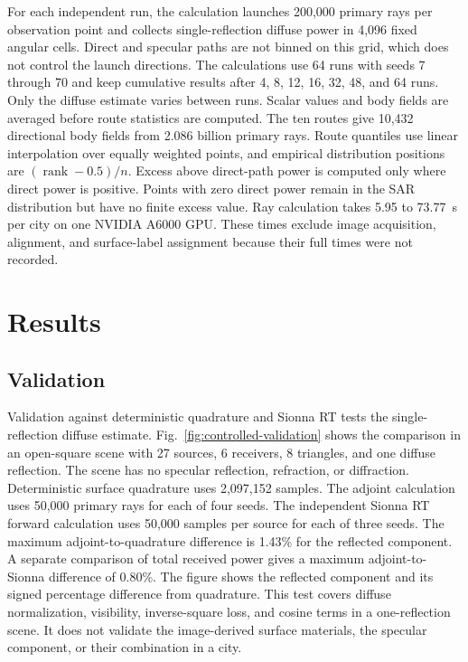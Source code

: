 \documentclass{IEEEoj}
\begin{document}
For each independent run, the calculation launches 200,000 primary rays per
observation point and collects single-reflection diffuse power in 4,096 fixed
angular cells. Direct and specular paths are not binned on this grid, which does
not control the launch directions. The calculations use 64 runs with seeds 7
through 70 and keep cumulative results after 4, 8, 12, 16, 32, 48, and 64 runs.
Only the diffuse estimate varies between runs. Scalar values and body fields
are averaged before route statistics are computed. The ten routes give 10,432
directional body fields from 2.086 billion primary rays. Route quantiles use
linear interpolation over equally weighted points, and empirical distribution
positions are $(\operatorname{rank}-0.5)/n$. Excess above direct-path power is
computed only where direct power is positive. Points with zero direct power
remain in the SAR distribution but have no finite excess value. Ray calculation
takes 5.95 to 73.77~s per city on one NVIDIA A6000 GPU. These times exclude
image acquisition, alignment, and surface-label assignment because their full
times were not recorded.

\section{Results}
\label{sec:results}

\subsection{Validation}
\label{sec:validation}

Validation against deterministic quadrature and Sionna RT tests the
single-reflection diffuse estimate. Fig.~\ref{fig:controlled-validation} shows
the comparison in an open-square scene with 27 sources, 6 receivers, 8
triangles, and one diffuse reflection. The scene has no specular reflection,
refraction, or diffraction. Deterministic surface quadrature uses 2,097,152
samples. The adjoint calculation uses 50,000 primary rays for each of four
seeds. The independent Sionna RT forward calculation uses 50,000 samples per
source for each of three seeds. The maximum adjoint-to-quadrature difference is
1.43\% for the reflected component. A separate comparison of total received
power gives a maximum adjoint-to-Sionna difference of 0.80\%. The figure shows
the reflected component and its signed percentage difference from quadrature. This test
covers diffuse normalization, visibility, inverse-square loss, and cosine terms
in a one-reflection scene. It does not validate the image-derived surface
materials, the specular component, or their combination in a city.
\end{document}

